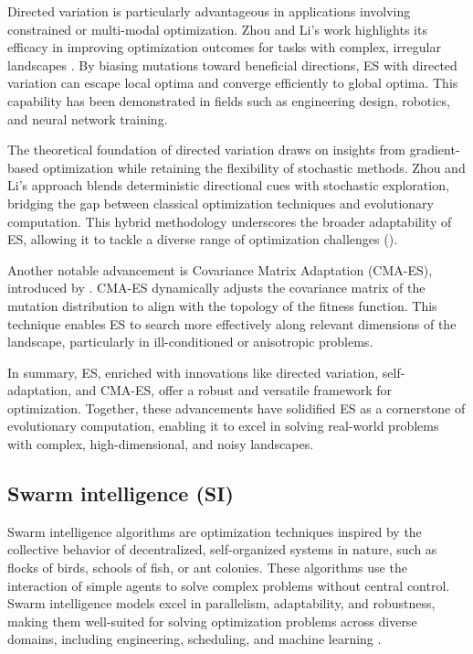 Directed variation is particularly advantageous in applications involving constrained or multi-modal optimization. Zhou and Li's work highlights its efficacy in improving optimization outcomes for tasks with complex, irregular landscapes \parencite{zhou2003directed}. By biasing mutations toward beneficial directions, ES with directed variation can escape local optima and converge efficiently to global optima. This capability has been demonstrated in fields such as engineering design, robotics, and neural network training.

The theoretical foundation of directed variation draws on insights from gradient-based optimization while retaining the flexibility of stochastic methods. Zhou and Li's approach blends deterministic directional cues with stochastic exploration, bridging the gap between classical optimization techniques and evolutionary computation. This hybrid methodology underscores the broader adaptability of ES, allowing it to tackle a diverse range of optimization challenges (\cite{zhou2003directed,beyer2002evolution}).

Another notable advancement is Covariance Matrix Adaptation (CMA-ES), introduced by \textcite{hansen2001completely}. CMA-ES dynamically adjusts the covariance matrix of the mutation distribution to align with the topology of the fitness function. This technique enables ES to search more effectively along relevant dimensions of the landscape, particularly in ill-conditioned or anisotropic problems. %


In summary, ES, enriched with innovations like directed variation, self-adaptation, and CMA-ES, offer a robust and versatile framework for optimization. %
Together, these advancements have solidified ES as a cornerstone of evolutionary computation, enabling it to excel in solving real-world problems with complex, high-dimensional, and noisy landscapes.



\subsection{Swarm intelligence (SI)} 
Swarm intelligence algorithms are optimization techniques inspired by the collective behavior of decentralized, self-organized systems in nature, such as flocks of birds, schools of fish, or ant colonies. These algorithms use the interaction of simple agents to solve complex problems without central control. Swarm intelligence models excel in parallelism, adaptability, and robustness, making them well-suited for solving optimization problems across diverse domains, including engineering, scheduling, and machine learning \parencite{kennedy1995particle}.

